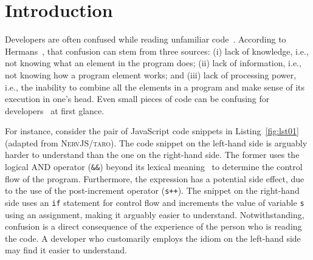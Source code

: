 \section{Introduction}
\label{intro}





Developers are often confused while reading unfamiliar code~\cite{Ebert:2021:ESC}. According to Hermans~\cite{ProgrammersBrain}, that confusion can stem from three sources: (i) lack of knowledge, i.e., not knowing what an element in the program does; (ii) lack of information, i.e., not knowing how a program element works; and (iii) lack of processing power, i.e., the inability to combine all the elements in a program and make sense of its execution in one's head. Even small pieces of code can be confusing for developers~\cite{Ajami:2017:SPI,DBLP:conf/sigsoft/GopsteinIYDZYC17} at first glance.

For instance, consider the pair of JavaScript code snippets in Listing~\ref{fig:lst01} (adapted from \textsc{NervJS/taro}). The code snippet on the left-hand side is arguably harder to understand than the one on the right-hand side. The former uses the logical AND operator (\texttt{\&\&}) beyond its lexical meaning~\cite{castor2018} to determine the control flow of the program. Furthermore, the expression has a potential side effect, due to the use of the post-increment operator (\texttt{s++}). The snippet on the right-hand side uses an \texttt{if} statement for control flow and increments the value of variable \texttt{s} using an assignment, making it arguably easier to understand. Notwithstanding, confusion is a direct consequence of the experience of the person who is reading the code. A developer who customarily employs the idiom on the left-hand side may find it easier to understand. 

